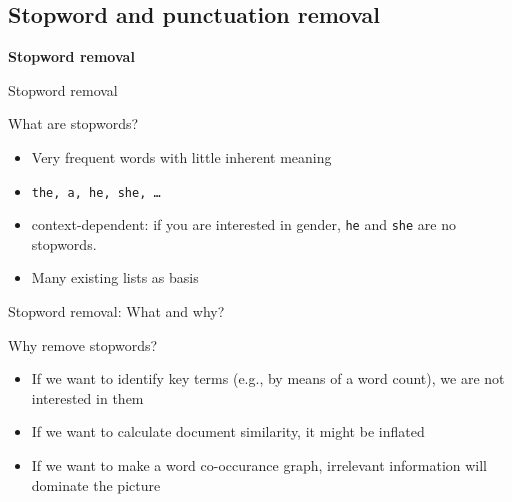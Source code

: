 \documentclass[handout]{beamer}
\begin{document}
\subsection{Stopword and punctuation removal}

\begin{frame}
\textbf{Stopword removal} \\
\vspace{1cm}
\end{frame}

\begin{frame}{Stopword removal}
\begin{block}{What are stopwords?}
\begin{itemize}
\item Very frequent words with little inherent meaning
\item \texttt{the, a, he, she, \ldots}
\item context-dependent: if you are interested in gender, \texttt{he} and \texttt{she} are no stopwords. 
\item Many existing lists as basis
\end{itemize}
\end{block}

\end{frame}

\begin{frame}{Stopword removal: What and why?}
\begin{block}{Why remove stopwords?}
	\begin{itemize}
		\item If we want to identify key terms (e.g., by means of a word count), we are not interested in them
		\item If we want to calculate document similarity, it might be inflated
		\item If we want to make a word co-occurance graph, irrelevant information will dominate the picture
	\end{itemize}
\end{block}
\end{frame}
\end{document}

